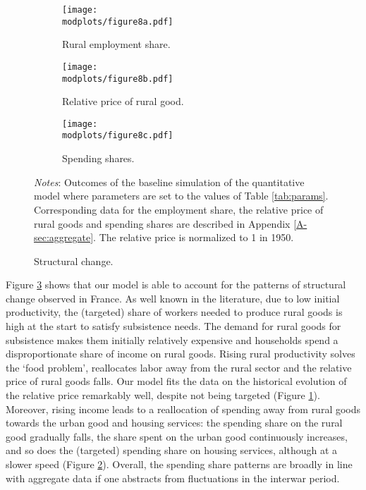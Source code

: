 \documentclass[./20250130-paper.tex]{subfiles}
\begin{document}
\begin{figure}[h!]
	\begin{adjustbox}{center}
		\begin{subfigure}{\pthree\textwidth}
			\texttt{[image: \\modplots/figure8a.pdf]}
			\caption{Rural employment share.}
		\end{subfigure}
		\begin{subfigure}{\pthree\textwidth}
			\texttt{[image: \\modplots/figure8b.pdf]}
			\caption{Relative price of rural good.\label{fig:model-relativeprice}} 
		\end{subfigure}
		\begin{subfigure}{\pthree\textwidth}
			\texttt{[image: \\modplots/figure8c.pdf]}
			\caption{Spending shares.\label{fig:model-spending}} 
		\end{subfigure}
	\end{adjustbox}
	\caption{Structural change. \label{fig:model-stchange}}
	
	{\footnotesize \textit{Notes}: Outcomes of the baseline simulation of the quantitative model where parameters are set to the values of Table \ref{tab:params}. Corresponding data for the employment share, the relative price of rural goods and spending shares are described in Appendix \ref{A-sec:aggregate}. The relative price is normalized to 1 in 1950.}
\end{figure}


 Figure \ref{fig:model-stchange} shows that our model is able to account for the patterns of structural change observed in France. As well known in the literature, due to low initial productivity, the (targeted) share of workers needed to produce rural goods is high at the start to satisfy subsistence needs. The demand for rural goods for subsistence makes them initially relatively expensive and households spend a disproportionate share of income on rural goods. Rising rural productivity solves the `food problem', reallocates labor away from the rural sector and the relative price of rural goods falls. Our model fits the data on the historical evolution of the relative price remarkably well, despite not being targeted (Figure \ref{fig:model-relativeprice}). Moreover, rising income leads to a reallocation of spending away from rural goods towards the urban good and housing services: the spending share on the rural good gradually falls, the share spent on the urban good continuously increases, and so does the (targeted) spending share on housing services, although at a slower speed (Figure \ref{fig:model-spending}). Overall, the spending share patterns are broadly in line with aggregate data if one abstracts from fluctuations in the interwar period.
\end{document}
